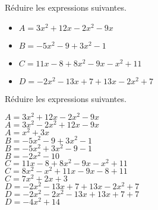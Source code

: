 \begin{exercice*}
    Réduire les expressions suivantes.    
    \begin{itemize}
        \item[] $A=3x^2+12x-2x^2-9x$
        \item[] $B=-5x^2-9+3x^2-1$
        \item[] $C=11x-8+8x^2-9x-x^2+11$
        \item[] $D=-2x^2-13x+7+13x-2x^2+7$
    \end{itemize}
\end{exercice*}
\begin{corrige}
    Réduire les expressions suivantes.    
    \begin{itemize}
        \def\item{}
        \item $A=3x^2+12x-2x^2-9x$\\
        {\red $A=3x^2-2x^2+12x-9x$\\
        $A=x^2+3x$\\\smallskip
        }
        \item $B=-5x^2-9+3x^2-1$\\
        {\red $B=-5x^2+3x^2-9-1$\\
        $B=-2x^2-10$\\\smallskip
        }
        \item $C=11x-8+8x^2-9x-x^2+11$\\
        {\red $C=8x^2-x^2+11x-9x-8+11$\\
        $C=7x^2+2x+3$\\\smallskip
        }
        \item $D=-2x^2-13x+7+13x-2x^2+7$\\
        {\red $D=-2x^2-2x^2-13x+13x+7+7$\\
        $D=-4x^2+14$
        }
    \end{itemize}
\end{corrige}


